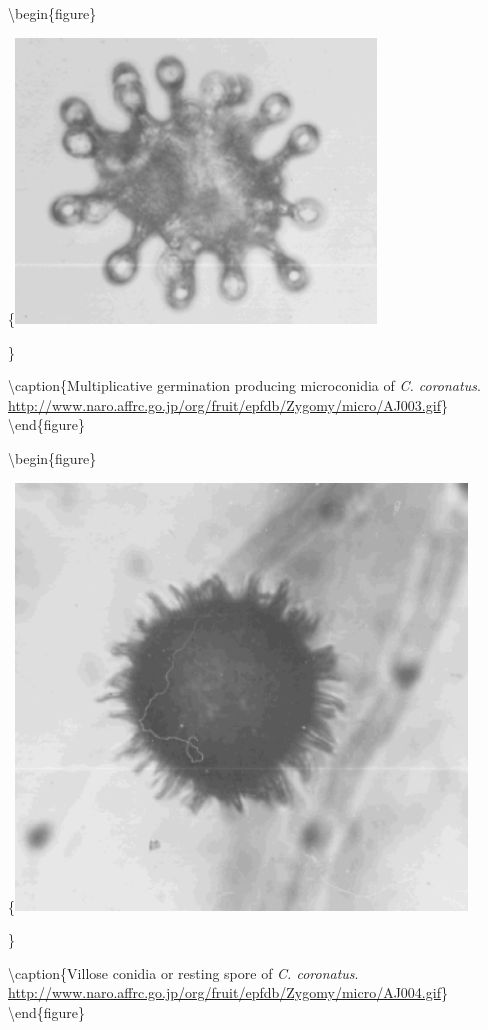 \documentclass[]{book}
\begin{document}
\textbackslash begin\{figure\}

\{\centering \includegraphics[width=3.77in]{img/Ch5_Fig5}

\}

\textbackslash caption\{Multiplicative germination producing microconidia of \emph{C. coronatus}. \url{http://www.naro.affrc.go.jp/org/fruit/epfdb/Zygomy/micro/AJ003.gif}\}\label{fig:ch5fig5}
\textbackslash end\{figure\}

\textbackslash begin\{figure\}

\{\centering \includegraphics[width=4.72in]{img/Ch5_Fig6}

\}

\textbackslash caption\{Villose conidia or resting spore of \emph{C. coronatus}. \url{http://www.naro.affrc.go.jp/org/fruit/epfdb/Zygomy/micro/AJ004.gif}\}\label{fig:ch5fig6}
\textbackslash end\{figure\}
\end{document}
